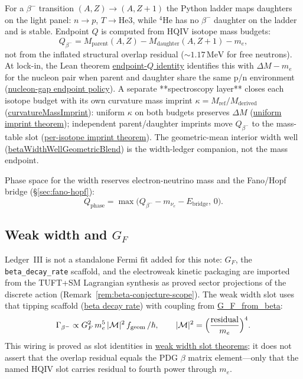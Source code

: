 \documentclass[11pt,notitlepage]{amsart}
\begin{document}
For a $\beta^-$ transition $(A,Z)\to(A,Z+1)$ the Python ladder maps daughters on
the light panel: $n\to p$, $T\to\mathrm{He3}$, while $^4\mathrm{He}$ has no
$\beta^-$ daughter on the ladder and is stable. Endpoint $Q$ is computed from
HQIV isotope mass budgets:
\[
  Q_{\beta^-} = M_{\mathrm{parent}}(A,Z) - M_{\mathrm{daughter}}(A,Z+1) - m_e,
\]
not from the inflated structural overlap residual ($\sim 1.17\,\mathrm{MeV}$ for
free neutrons). At lock-in, the Lean theorem
\hyperref[lean:endpoint-q-theorem]{endpoint-$Q$ identity}
identifies this with $\Delta M-m_e$ for the nucleon pair when parent and daughter
share the same p/n environment
(\hyperref[lean:endpoint-q-nucleon-gap]{nucleon-gap endpoint policy}).
A separate **spectroscopy layer** closes each isotope budget with its own curvature
mass imprint $\kappa=M_{\mathrm{ref}}/M_{\mathrm{derived}}$
(\hyperref[lean:curvature-mass-imprint]{curvatureMassImprint}):
uniform $\kappa$ on both budgets preserves $\Delta M$
(\hyperref[lean:endpoint-q-uniform-imprint]{uniform imprint theorem});
independent parent/daughter imprints move $Q_{\beta^-}$ to the mass-table slot
(\hyperref[lean:endpoint-q-per-isotope-imprint]{per-isotope imprint theorem}).
The geometric-mean interior width well
(\hyperref[lean:width-well-geometric-blend]{betaWidthWellGeometricBlend}) is the
width-ledger companion, not the mass endpoint.

Phase space for the width reserves electron-neutrino mass and the Fano/Hopf bridge
(\S\ref{sec:fano-hopf}):
\[
  Q_{\mathrm{phase}} = \max\bigl(Q_{\beta^-} - m_{\nu_e} - E_{\mathrm{bridge}},\,0\bigr).
\]

\subsection{Weak width and $G_F$}
\label{sec:weak-width}

Ledger~III is not a standalone Fermi fit added for this note: $G_F$, the
\texttt{beta\_decay\_rate} scaffold, and the electroweak kinetic packaging are imported
from the TUFT+SM Lagrangian synthesis \cite{hqiv-tuft-sm-lagrangian-paper} as proved
sector projections of the discrete action (Remark~\ref{rem:beta-conjecture-scope}).
The weak width slot uses that tipping scaffold
(\hyperref[lean:beta-decay-rate]{beta decay rate}) with coupling from
\hyperref[lean:gf-from-beta]{G\_F\_from\_beta}:
\[
  \Gamma_{\beta^-} \propto G_F^2\, m_e^5\, |\mathcal{M}|^2\, f_{\mathrm{geom}}\,/\hbar,
  \qquad
  |\mathcal{M}|^2 = \Bigl(\frac{\mathrm{residual}}{m_e}\Bigr)^4.
\]
This wiring is proved as slot identities in
\hyperref[lean:weak-width-slot]{weak width slot theorems}; it does not assert that
the overlap residual equals the PDG $\beta$ matrix element---only that the named
HQIV slot carries residual to fourth power through $m_e$.
\end{document}
